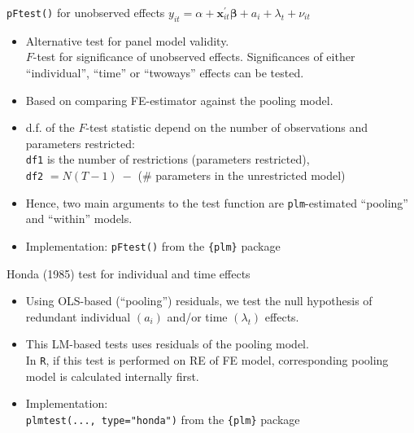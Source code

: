 \documentclass[usenames,dvipsnames]{beamer}
\begin{document}
\begin{frame}{\texttt{pFtest()} for unobserved effects}
\small 
$y_{it} = \alpha + \bm{x}^{\prime}_{it} \bm{\beta} + a_i + \lambda_t + \nu_{it}$\\ \medskip
\begin{itemize}
    \item Alternative test for panel model validity. \\ \medskip $F$-test for significance of unobserved effects. Significances of either ``individual'', ``time'' or ``twoways'' effects can be tested.
    \medskip
    \item  Based on comparing FE-estimator against the pooling model. 
    \medskip 
    \item d.f. of the $F$-test statistic depend on the number of observations and parameters restricted:\\
    \texttt{df1} is the number of restrictions (parameters restricted), \\
    \texttt{df2} $= N(T-1)~-$ (\# parameters in the unrestricted model)
    \medskip
    \item Hence, two main arguments to the test function are \texttt{plm}-estimated ``pooling'' and ``within'' models. 
    \medskip
    \item Implementation: \texttt{pFtest()} from the \texttt{\{plm\}} package
\end{itemize}    
\end{frame}
\begin{frame}{Honda (1985) test for individual and time effects}
\begin{itemize}
    \item Using OLS-based (``pooling'') residuals, we test the null hypothesis of redundant individual $(a_i)$ and/or time $ (\lambda_t) $ effects.
    \bigskip
    \item This LM-based tests uses residuals of the pooling model. \\ \medskip In \texttt{R}, if this test is performed on RE of FE model, corresponding pooling model is calculated internally first. 
    \bigskip
    \item Implementation: \\ \medskip \texttt{plmtest(..., type="honda")} from the \texttt{\{plm\}} package
\end{itemize}
\end{frame}
\end{document}
